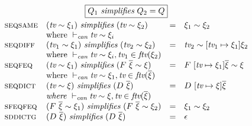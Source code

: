 \documentclass{article}
\newcommand{\multi}[1]{{\overline{#1}}}
\newcommand{\rulen}[1]{\textsc{#1}}
\begin{document}
\[
\begin{array}{llcl}
\multicolumn{4}{c}{\framebox{$Q_1 ~ \textit{simplifies} ~ Q_2 = Q$}} \\
\\[-3mm]

\rulen{seqsame} & (\textit{tv} \sim \xi_1) ~ \textit{simplifies} ~ (\textit{tv} \sim \xi_2) & = & \xi_1 \sim \xi_2 \\
                & \text{where} ~ \vdash_\textit{can} \textit{tv} \sim \xi_i \\
\rulen{seqdiff} & (\textit{tv}_1 \sim \xi_1) ~ \textit{simplifies} ~ (\textit{tv}_2 \sim \xi_2) & = & \textit{tv}_2 \sim [\textit{tv}_1 \mapsto \xi_1] \xi_2 \\
                & \text{where} ~ \vdash_\textit{can} \textit{tv} \sim \xi_i, \textit{tv}_1 \in \textit{ftv}(\xi_2) \\
\rulen{seqfeq}  & (\textit{tv} \sim \xi_1) ~ \textit{simplifies} ~ (F ~ \multi{\xi} \sim \xi)   & = & F ~ [\textit{tv} \mapsto \xi_1]\multi{\xi} \sim \xi \\
                & \text{where} ~ \vdash_\textit{can} \textit{tv} \sim \xi_1, \textit{tv} \in \textit{ftv}(\multi{\xi}) \\
\rulen{seqdict} & (\textit{tv} \sim \xi) ~ \textit{simplifies} ~ (D ~ \multi{\xi})           & = & D ~ [\textit{tv} \mapsto \xi]\multi{\xi} \\
                & \textit{where} ~ \vdash_\textit{can} \textit{tv} \sim \xi, \textit{tv} \in \textit{ftv}(\multi{\xi}) \\
\rulen{sfeqfeq} & (F ~ \multi{\xi} \sim \xi_1) ~ \textit{simplifies} ~ (F ~ \multi{\xi} \sim \xi_2) & = & \xi_1 \sim \xi_2 \\
\rulen{sddictg} & (D ~ \multi{\xi}) ~ \textit{simplifies} ~ (D ~ \multi{\xi})               & = & \epsilon \\
\end{array}
\]
\end{document}
